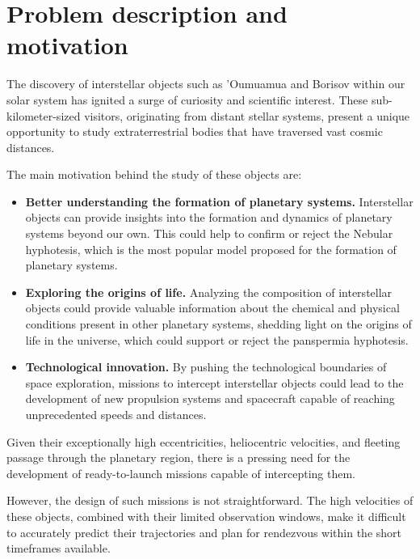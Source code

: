 \section{Problem description and motivation}

The discovery of interstellar objects such as 'Oumuamua and Borisov within our
solar system has ignited a surge of curiosity and scientific interest. These
sub-kilometer-sized visitors, originating from distant stellar systems, present
a unique opportunity to study extraterrestrial bodies that have traversed vast
cosmic distances. 

The main motivation behind the study of these objects are:

\begin{itemize}

  \item \textbf{Better understanding the formation of planetary systems.}
        Interstellar objects can provide insights into the formation and
        dynamics of planetary systems beyond our own. This could help to
        confirm or reject the Nebular hyphotesis, which is the most popular
        model proposed for the formation of planetary systems.

  \item \textbf{Exploring the origins of life.} Analyzing the composition of
        interstellar objects could provide valuable information about the
        chemical and physical conditions present in other planetary
        systems, shedding light on the origins of life in the universe, which
        could support or reject the panspermia hyphotesis.

  \item \textbf{Technological innovation.} By pushing the technological
        boundaries of space exploration, missions to intercept interstellar
        objects could lead to the development of new propulsion systems and
        spacecraft capable of reaching unprecedented speeds and distances.

\end{itemize}

Given their exceptionally high eccentricities, heliocentric velocities, and
fleeting passage through the planetary region, there is a pressing need for the
development of ready-to-launch missions capable of intercepting them.

However, the design of such missions is not straightforward. The high velocities
of these objects, combined with their limited observation windows, make it
difficult to accurately predict their trajectories and plan for rendezvous
within the short timeframes available.


